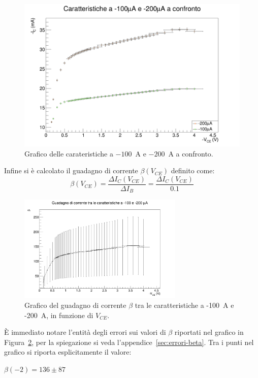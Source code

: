 \documentclass[../main.tex]{subfiles}
\begin{document}
    \begin{figure}[h!]
        \centering
        \includegraphics[width=.8\textwidth]{../../images/caratteristiche-confronto}
        \caption{Grafico delle carateristiche a $-100$~\textmu A e $-200$~\textmu A a confronto.}
        \label{fig:aggregato}
    \end{figure}

    \noindent Infine si è calcolato il guadagno di corrente $\beta(V_{CE})$ definito come:
    \begin{equation*}
        \beta(V_{CE}) = \frac{\varDelta I_C(V_{CE})}{\varDelta I_B} = \frac{\varDelta I_C(V_{CE})}{0.1}
    \end{equation*}

    \begin{figure}[h!]
        \centering
        \includegraphics[width=0.7\textwidth]{../../images/beta}
        \caption{
            Grafico del guadagno di corrente $\beta$ tra le
            caratteristiche a -100~\textmu A e -200~\textmu A, in
            funzione di $V_{CE}$.
        }
        \label{fig:beta}
    \end{figure}
    \noindent È immediato notare l'entità degli errori sui valori di $\beta$
    riportati nel grafico in Figura~\ref{fig:beta}, per la
    spiegazione si veda l'appendice~\ref{sec:errori-beta}.
    Tra i punti nel grafico si riporta esplicitamente il valore:
    \begin{center}
        $\beta(-2) = 136 \pm  87$
    \end{center}
\end{document}

